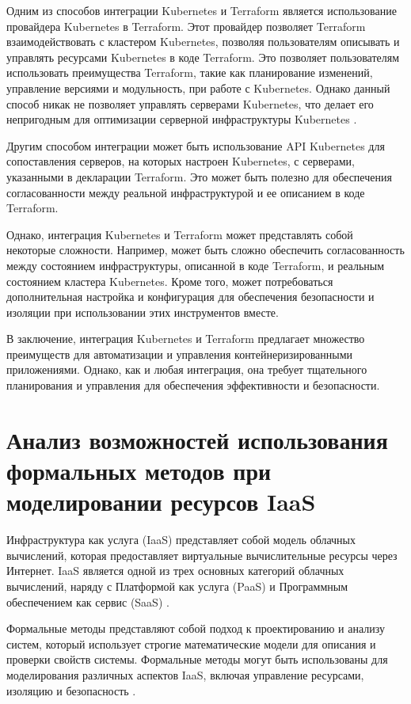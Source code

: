 Одним из способов интеграции Kubernetes и Terraform является использование
провайдера Kubernetes в Terraform. Этот провайдер позволяет Terraform
взаимодействовать с кластером Kubernetes, позволяя пользователям описывать
и управлять ресурсами Kubernetes в коде Terraform. Это позволяет
пользователям использовать преимущества Terraform, такие как планирование
изменений, управление версиями и модульность, при работе с Kubernetes.
Однако данный способ никак не позволяет управлять серверами
Kubernetes, что делает его непригодным для оптимизации серверной
инфраструктуры Kubernetes \cite{davis2021bootstrapping}.

Другим способом интеграции может быть использование API Kubernetes
для сопоставления серверов, на которых настроен Kubernetes, с серверами,
указанными в декларации Terraform. Это может быть полезно для обеспечения
согласованности между реальной инфраструктурой и ее описанием в коде
Terraform.

Однако, интеграция Kubernetes и Terraform может представлять собой
некоторые сложности. Например, может быть сложно обеспечить согласованность
между состоянием инфраструктуры, описанной в коде Terraform,
и реальным состоянием кластера Kubernetes. Кроме того, может
потребоваться дополнительная настройка и конфигурация для обеспечения
безопасности и изоляции при использовании этих инструментов вместе.

В заключение, интеграция Kubernetes и Terraform предлагает множество
преимуществ для автоматизации и управления контейнеризированными
приложениями. Однако, как и любая интеграция, она требует тщательного
планирования и управления для обеспечения эффективности и безопасности.

\section{Анализ возможностей использования формальных методов при
моделировании ресурсов IaaS}
Инфраструктура как услуга (IaaS) представляет собой модель облачных
вычислений, которая предоставляет виртуальные вычислительные ресурсы
через Интернет. IaaS является одной из трех основных категорий облачных
вычислений, наряду с Платформой как услуга (PaaS) и Программным обеспечением
как сервис (SaaS) \cite{iaas2017}.

Формальные методы представляют собой подход к проектированию и анализу
систем, который использует строгие математические модели для описания
и проверки свойств системы. Формальные методы могут быть использованы
для моделирования различных аспектов IaaS, включая управление ресурсами,
изоляцию и безопасность 
\cite{bijon2014formal, amato2018improving, de2012formal}.

